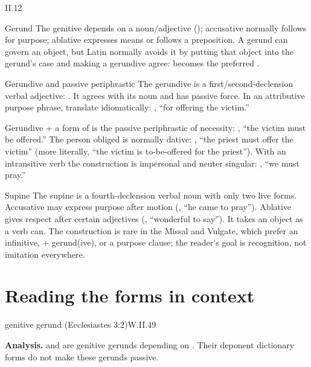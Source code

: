 \begin{courseunit}{II.12}
\begin{grammarbox}{Gerund}
The genitive depends on a noun/adjective (); accusative normally follows
 for purpose; ablative expresses means or follows a preposition.  A gerund can govern
an object, but Latin normally avoids it by putting that object into the gerund's case and
making a gerundive agree:  becomes the preferred
.
\end{grammarbox}

\begin{grammarbox}{Gerundive and passive periphrastic}
The gerundive is a first/second-declension verbal adjective:
.  It agrees with its noun and has
passive force.  In an attributive purpose phrase, translate idiomatically:
, ``for offering the victim.''

Gerundive + a form of  is the passive periphrastic of necessity:
, ``the victim must be offered.''  The person obliged is normally
dative: , ``the priest must offer the victim'' (more
literally, ``the victim is to-be-offered for the priest'').  With an intransitive verb the
construction is impersonal and neuter singular: , ``we must pray.''
\end{grammarbox}

\begin{grammarbox}{Supine}
The supine is a fourth-declension verbal noun with only two live forms.  Accusative
 may express purpose after motion (, ``he came to pray'').
Ablative  gives respect after certain adjectives (,
``wonderful to say'').  It takes an object as a verb can.  The construction is rare in the
Missal and Vulgate, which prefer an infinitive,  + gerund(ive), or a purpose clause;
the reader's goal is recognition, not imitation everywhere.
\end{grammarbox}

\section{Reading the forms in context}

\begin{workedexample}{genitive gerund (Ecclesiastes 3:2)}{W.II.49}

\textbf{Analysis.}   and  are genitive gerunds depending on
.  Their deponent dictionary forms do not make these gerunds passive.


\end{workedexample}
\end{courseunit}
